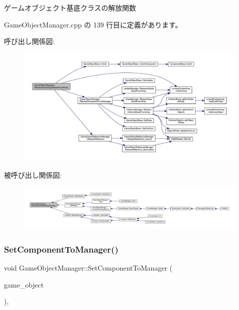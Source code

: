 ゲームオブジェクト基底クラスの解放関数 



 Game\+Object\+Manager.\+cpp の 139 行目に定義があります。

呼び出し関係図\+:
\nopagebreak
\begin{figure}[H]
\begin{center}
\leavevmode
\includegraphics[width=350pt]{class_game_object_manager_a83342c1c358e32f6478ae3428fcb25fa_cgraph}
\end{center}
\end{figure}
被呼び出し関係図\+:
\nopagebreak
\begin{figure}[H]
\begin{center}
\leavevmode
\includegraphics[width=350pt]{class_game_object_manager_a83342c1c358e32f6478ae3428fcb25fa_icgraph}
\end{center}
\end{figure}
\mbox{\label{class_game_object_manager_a4c6cdb6d0a1f43a2e2e705677fa2f5f6}} 
\subsubsection{\texorpdfstring{Set\+Component\+To\+Manager()}{SetComponentToManager()}}
{\footnotesize\ttfamily void Game\+Object\+Manager\+::\+Set\+Component\+To\+Manager (\begin{DoxyParamCaption}\item[{\mbox{\hyperlink{class_game_object_base}{Game\+Object\+Base}} $\ast$}]{game\+\_\+object }\end{DoxyParamCaption})\hspace{0.3cm}{\ttfamily [static]}, {\ttfamily [private]}}



